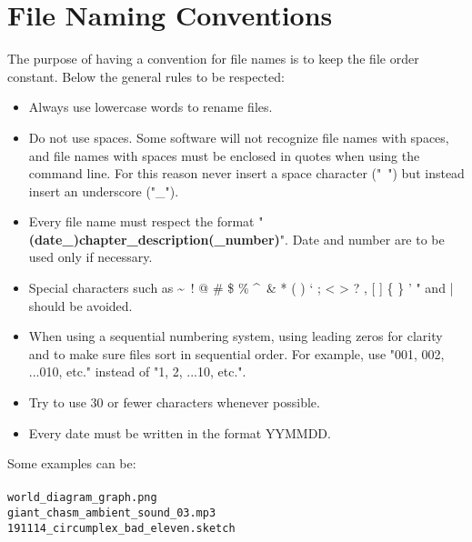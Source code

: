 \section{File Naming Conventions}
The purpose of having a convention for file names is to keep the file order constant. Below the general rules to be respected:
\begin{itemize}
	\item Always use lowercase words to rename files.
	\item Do not use spaces. Some software will not recognize file names with spaces, and file names with spaces must be enclosed in quotes when using the command line. For this reason never insert a space character ("\ ") but instead insert an underscore ("\_").
	\item Every file name must respect the format "\textbf{(date\_)chapter\_description(\_number)}". Date and number are to be used only if necessary.
	\item Special characters such as \textasciitilde\ ! @ \# \$ \% \textasciicircum\ \& * ( ) ` ; < > ? , [ ] \{ \} ' " and | should be avoided.
	\item When using a sequential numbering system, using leading zeros for clarity and to make sure files sort in sequential order. For example, use "001, 002, ...010, etc." instead of "1, 2, ...10, etc.".
	\item Try to use 30 or fewer characters whenever possible.
	\item Every date must be written in the format YYMMDD.
\end{itemize}

Some examples can be:
\\\\
\texttt{world\_diagram\_graph.png}\\
\texttt{giant\_chasm\_ambient\_sound\_03.mp3}\\
\texttt{191114\_circumplex\_bad\_eleven.sketch}\\

